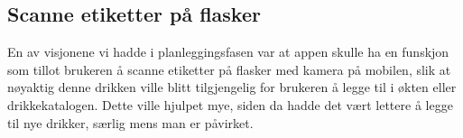 \subsection{Scanne etiketter på flasker}
En av visjonene vi hadde i planleggingsfasen var at appen skulle ha en funskjon som tillot brukeren å scanne etiketter på flasker med kamera på mobilen, slik at nøyaktig denne drikken ville blitt tilgjengelig for brukeren å legge til i økten eller drikkekatalogen. Dette ville hjulpet mye, siden da hadde det vært lettere å legge til nye drikker, særlig mens man er påvirket.